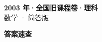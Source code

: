 \documentclass[zihao=-4, a4paper]{ctexart}
\begin{document}
\begin{center}
  {\Large\bfseries 2003 年·全国旧课程卷·理科}\\[4pt]
  {\large 数学 · 简答版}
\end{center}
\medskip
{}

\clearpage
{}
\begin{center}{\Large\bfseries 答案速查}\end{center}
\medskip

\end{document}
